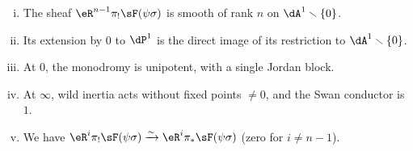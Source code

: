 \begin{theorem_}\label{VI:7-8}
\begin{enumerate}[(i)]
  \item The sheaf $\eR^{n-1}\pi_! \sF(\psi\sigma)$ is smooth of rank $n$ on 
    $\dA^1\setminus \{0\}$. 
  \item Its extension by $0$ to $\dP^1$ is the direct image of its 
    restriction to $\dA^1\setminus \{0\}$. 
  \item At $0$, the monodromy is unipotent, with a single Jordan block.
  \item At $\infty$, wild inertia acts without fixed points $\ne 0$, and the 
    Swan conductor is $1$. 
  \item We have $\eR^i \pi_! \sF(\psi\sigma) \iso \eR^i \pi_\ast \sF(\psi\sigma)$ 
    (zero for $i\ne n-1$).
\end{enumerate}
\end{theorem_}
